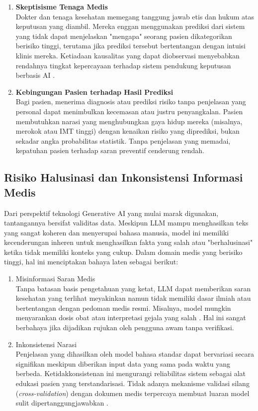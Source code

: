 \begin{enumerate}
    \item \textbf{Skeptisisme Tenaga Medis}\\
    Dokter dan tenaga kesehatan memegang tanggung jawab etis dan hukum atas keputusan yang diambil. Mereka enggan menggunakan prediksi dari sistem yang tidak dapat menjelaskan "mengapa" seorang pasien dikategorikan berisiko tinggi, terutama jika prediksi tersebut bertentangan dengan intuisi klinis mereka. Ketiadaan kausalitas yang dapat diobservasi menyebabkan rendahnya tingkat kepercayaan terhadap sistem pendukung keputusan berbasis AI \autocite{Linardatos2021Explainable}.
    
    \item \textbf{Kebingungan Pasien terhadap Hasil Prediksi}\\
    Bagi pasien, menerima diagnosis atau prediksi risiko tanpa penjelasan yang personal dapat menimbulkan kecemasan atau justru penyangkalan. Pasien membutuhkan narasi yang menghubungkan gaya hidup mereka (misalnya, merokok atau IMT tinggi) dengan kenaikan risiko yang diprediksi, bukan sekadar angka probabilitas statistik. Tanpa penjelasan yang memadai, kepatuhan pasien terhadap saran preventif cenderung rendah.
\end{enumerate}

\subsection{Risiko Halusinasi dan Inkonsistensi Informasi Medis}
Dari perspektif teknologi Generative AI yang mulai marak digunakan, tantangannya bersifat validitas data. Meskipun LLM mampu menghasilkan teks yang sangat koheren dan menyerupai bahasa manusia, model ini memiliki kecenderungan inheren untuk menghasilkan fakta yang salah atau "berhalusinasi" ketika tidak memiliki konteks yang cukup. Dalam domain medis yang berisiko tinggi, hal ini menciptakan bahaya laten sebagai berikut:

\begin{enumerate}
    \item Misinformasi Saran Medis\\
    Tanpa batasan basis pengetahuan yang ketat, LLM dapat memberikan saran kesehatan yang terlihat meyakinkan namun tidak memiliki dasar ilmiah atau bertentangan dengan pedoman medis resmi. Misalnya, model mungkin menyarankan dosis obat atau interpretasi gejala yang salah \autocite{Li2023ChatGPT}. Hal ini sangat berbahaya jika dijadikan rujukan oleh pengguna awam tanpa verifikasi.
    
    \item Inkonsistensi Narasi\\
    Penjelasan yang dihasilkan oleh model bahasa standar dapat bervariasi secara signifikan meskipun diberikan input data yang sama pada waktu yang berbeda. Ketidakkonsistenan ini mengurangi reliabilitas sistem sebagai alat edukasi pasien yang terstandarisasi. Tidak adanya mekanisme validasi silang (\emph{cross-validation}) dengan dokumen medis terpercaya membuat luaran model sulit dipertanggungjawabkan \autocite{Ji2023Survey}.
\end{enumerate}


